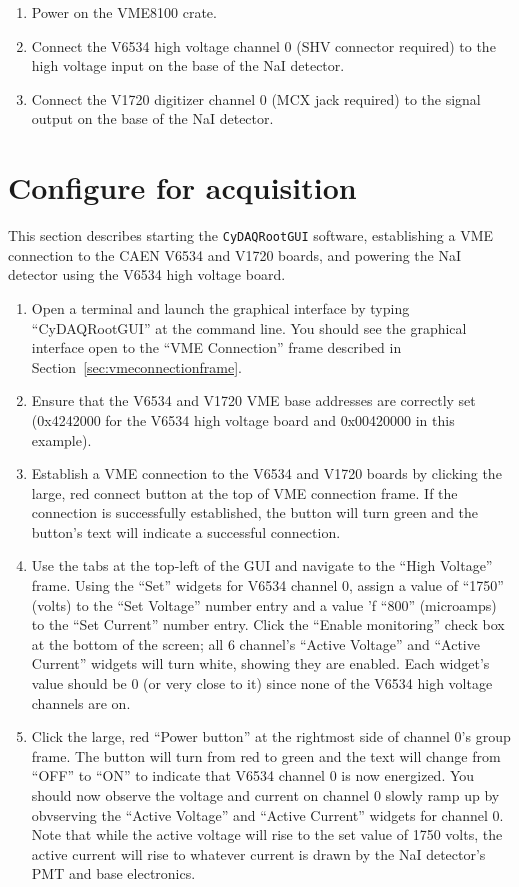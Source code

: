 \begin{enumerate}
\item{Power on the VME8100 crate.}
\item{Connect the V6534 high voltage channel 0 (SHV connector
  required) to the high voltage input on the base of the NaI
  detector.}
\item{Connect the V1720 digitizer channel 0 (MCX jack required) to
  the signal output on the base of the NaI detector.}
\end{enumerate}

\section{Configure \ADAQ for acquisition}
\label{sec:configure1}
This section describes starting the \texttt{CyDAQRootGUI} software,
establishing a VME connection to the CAEN V6534 and V1720 boards, and
powering the NaI detector using the V6534 high voltage board.

\begin{enumerate}
  \item{Open a terminal and launch the \ADAQ graphical interface by
    typing ``CyDAQRootGUI'' at the command line. You should see the
    graphical interface open to the ``VME Connection'' frame described
    in Section~\ref{sec:vmeconnectionframe}.}
  \item{Ensure that the V6534 and V1720 VME base addresses are
    correctly set (0x4242000 for the V6534 high voltage board and
    0x00420000 in this example).}
  \item{Establish a VME connection to the V6534 and V1720 boards by
    clicking the large, red connect button at the top of VME
    connection frame. If the connection is successfully established,
    the button will turn green and the button's text will indicate a
    successful connection.}
  \item{Use the tabs at the top-left of the GUI and navigate to the
    ``High Voltage'' frame. Using the ``Set'' widgets for V6534
    channel 0, assign a value of ``1750'' (volts) to the ``Set
    Voltage'' number entry and a value 'f ``800'' (microamps) to the
    ``Set Current'' number entry. Click the ``Enable monitoring''
    check box at the bottom of the screen; all 6 channel's ``Active
    Voltage'' and ``Active Current'' widgets will turn white, showing
    they are enabled. Each widget's value should be 0 (or very close
    to it) since none of the V6534 high voltage channels are on.}
  \item{Click the large, red ``Power button'' at the rightmost side of
    channel 0's group frame. The button will turn from red to green
    and the text will change from ``OFF'' to ``ON'' to indicate that
    V6534 channel 0 is now energized. You should now observe the
    voltage and current on channel 0 slowly ramp up by obvserving the
    ``Active Voltage'' and ``Active Current'' widgets for channel
    0. Note that while the active voltage will rise to the set value
    of 1750 volts, the active current will rise to whatever current is
    drawn by the NaI detector's PMT and base electronics.}
\end{enumerate}

